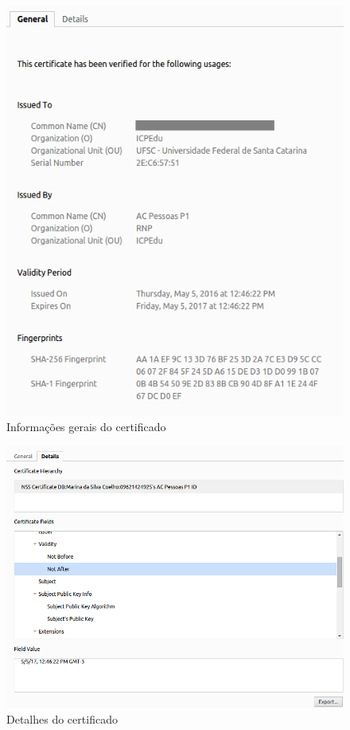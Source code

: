 \begin{figure}[ht]
     \centering
     \includegraphics[scale=0.5]{images/geralcert.png}
     \caption{Informações gerais do certificado}
     \label{fig:geralcert}
\end{figure}

\begin{figure}[ht]
     \centering
     \includegraphics[scale=0.5]{images/details.png}
     \caption{Detalhes do certificado}
     \label{fig:detailscert}
\end{figure}


